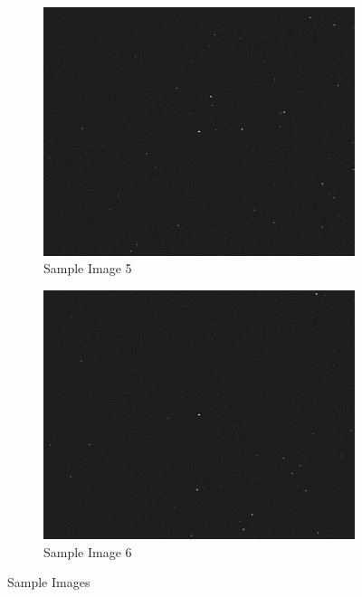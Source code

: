 \documentclass[../../main.tex]{subfiles}
\begin{document}
\begin{figure}[h!]
\begin{subfigure}[b]{0.45\textwidth}
         \label{fig:sample_4}
    \end{subfigure}
    \\
    \begin{subfigure}[b]{0.45\textwidth}
        \centering
        \includegraphics[width=\textwidth]{Figures/Model/Sample Images/Image_5.png}
        \caption{Sample Image 5}
        \label{fig:sample_5}
    \end{subfigure}
    \hfill
    \begin{subfigure}[b]{0.45\textwidth}
         \centering
         \includegraphics[width=\textwidth]{Figures/Model/Sample Images/Image_6.png}
         \caption{Sample Image 6}
         \label{fig:sample_6}
    \end{subfigure}
    \caption{Sample Images}
    \label{fig:sample_images}
\end{figure}
\end{document}
